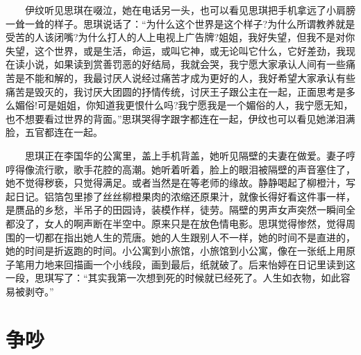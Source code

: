 \documentclass[12pt,UTF8]{ctexbook}
\begin{document}
　　伊纹听见思琪在啜泣，她在电话另一头，也可以看见思琪把手机拿远了小肩膀一耸一耸的样子。思琪说话了：\enquote{为什么这个世界是这个样子?为什么所谓教养就是受苦的人该闭嘴?为什么打人的人上电视上广告牌?姐姐，我好失望，但我不是对你失望，这个世界，或是生活，命运，或叫它神，或无论叫它什么，它好差劲，我现在读小说，如果读到赏善罚恶的好结局，我就会哭，我宁愿大家承认人间有一些痛苦是不能和解的，我最讨厌人说经过痛苦才成为更好的人，我好希望大家承认有些痛苦是毁灭的，我讨厌大团圆的抒情传统，讨厌王子跟公主在一起，正面思考是多么媚俗!可是姐姐，你知道我更恨什么吗?我宁愿我是一个媚俗的人，我宁愿无知，也不想要看过世界的背面。}思琪哭得字跟字都连在一起，伊纹也可以看见她涕泪满脸，五官都连在一起。

　　思琪正在李国华的公寓里，盖上手机背盖，她听见隔壁的夫妻在做爱。妻子哼哼得像流行歌，歌手花腔的高潮。她听着听着，脸上的眼泪被隔壁的声音塞住了，她不觉得秽亵，只觉得满足。或者当然是在等老师的缘故。静静喝起了柳橙汁，写起日记。铝箔包里掺了丝丝柳橙果肉的浓缩还原果汁，就像长得好看这件事一样，是赝品的乡愁，半吊子的田园诗，装模作样，徒劳。隔壁的男声女声突然一瞬间全都没了，女人的啊声断在半空中。原来只是在放色情电影。思琪觉得惨然，觉得周围的一切都在指出她人生的荒唐。她的人生跟别人不一样，她的时间不是直进的，她的时间是折返跑的时间。小公寓到小旅馆，小旅馆到小公寓，像在一张纸上用原子笔用力地来回描画一个小线段，画到最后，纸就破了。后来怡婷在日记里读到这一段，思琪写了：\enquote{其实我第一次想到死的时候就已经死了。人生如衣物，如此容易被剥夺。}

\hypertarget{ux4e89ux5435}{%
\section*{争吵}\label{ux4e89ux5435}}
\end{document}
